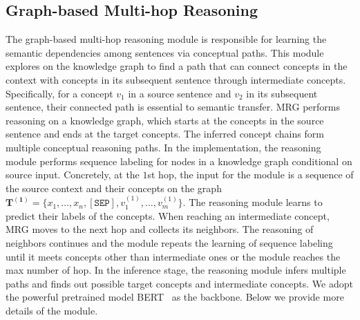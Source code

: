 \documentclass[letterpaper]{article} %
\begin{document}
\subsection{Graph-based Multi-hop Reasoning}
The graph-based multi-hop reasoning module is responsible for learning the semantic dependencies among sentences via conceptual paths. 
This module explores on the knowledge graph to find a path that can connect concepts in the context with concepts in its subsequent sentence through intermediate concepts. 
Specifically, for a concept $v_1$ in a source sentence and $v_2$ in its subsequent sentence, their connected path is essential to semantic transfer.
MRG performs reasoning on a knowledge graph, which starts at the concepts in the source sentence and ends at the target concepts. The inferred concept chains form multiple conceptual reasoning paths.
In the implementation, the reasoning module performs sequence labeling for nodes in a knowledge graph conditional on source input.
Concretely, at the $1$st hop, the input for the module is a sequence of the source context and their concepts on the graph $\bm{T^{(1)}}=\{x_1, \dots,x_{n},\mathtt{[SEP]},v^{(1)}_1,\dots,v^{(1)}_m\}$. The reasoning module learns to predict their labels of the concepts. 
When reaching an intermediate concept, MRG moves to the next hop and collects its neighbors.
The reasoning of neighbors continues and the module repeats the learning of sequence labeling until it meets concepts other than intermediate ones or the module reaches the max number of hop.
In the inference stage, the reasoning module infers multiple paths and finds out possible target concepts and intermediate concepts. 
We adopt the powerful pretrained model BERT~\cite{devlin-et-al:bert} as the backbone. Below we provide more details of the module. 
\end{document}
